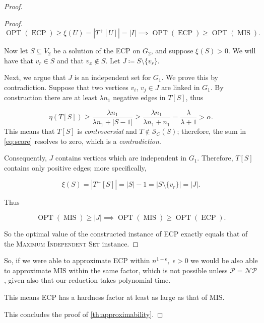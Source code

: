 \begin{proof}
\begin{proof}
		\begin{equation}
			\operatorname{OPT}(\operatorname{ECP}) \geq \xi(U) = |T^{+}[U]| =
			|I| \implies \operatorname{OPT}(\operatorname{ECP}) \geq
			\operatorname{OPT}(\operatorname{MIS}).
		\end{equation}

		Now let $S \subseteq V_2$ be a solution of the \acrshort{ECP} on $G_2$,
		and suppose $\xi(S) > 0$. We will have that $v_{r} \in S$ and that
		$v_{x} \not\in S $. Let $J \coloneqq S \setminus \{v_r\}$.

		Next, we argue that $J$ is an independent set for $G_1$. We prove this by
		contradiction. Suppose that two vertices $v_{i} $, $v_{j} \in J$ are
		linked in $G_1$. By construction there are at least $\lambda n_1$
		negative edges in $T[S]$, thus

		\begin{equation}
			\eta(T[S]) \geq \frac{\lambda n_1}{\lambda n_1 + |S-1|} \geq \frac{\lambda n_1}{\lambda n_1 + n_1} = \frac{\lambda
			}{\lambda + 1} > \alpha.
		\end{equation}
		This means that $T[S]$ is \emph{controversial} and $T \not\in
			\mathcal{S}_C(S) $; therefore, the sum in \eqref{eq:score} resolves to
		zero, which is a \emph{contradiction}.

		Consequently, $J$ contains vertices which are independent in $G_1$.
		Therefore, $T[S]$ contains only positive edges; more specifically,

		\begin{equation}
			\xi(S) = |T^{+}[S]| = |S| - 1 = |S \setminus \{v_r\}| = |J|.
		\end{equation}

		Thus

		\begin{equation}
			\operatorname{OPT}(\operatorname{MIS}) \geq |J| \implies
			\operatorname{OPT}(\operatorname{MIS}) \geq
			\operatorname{OPT}(\operatorname{ECP}).
		\end{equation}

		So the optimal value of the constructed instance of \acrshort{ECP}
		exactly equals that of the \textsc{Maximum Independent Set} instance.

	\end{proof}
	So, if we were able to approximate \acrshort{ECP} within
	$n^{1-\epsilon}, \; \epsilon > 0$ we would be also able to approximate MIS within the
	same factor, which is not possible unless $\mathcal{P} = \mathcal{NP}
	$, given also that our reduction takes polynomial time.

	This means \acrshort{ECP} has a hardness factor at least as large as that of MIS.

	This concludes the proof of \autoref{th:approximability}.
\end{proof}

